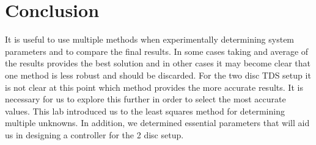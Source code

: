 \documentclass[11pt,titlepage]{article}
\begin{document}
	\section{Conclusion}
	It is useful to use multiple methods when experimentally determining system parameters and to compare the final results. In some cases taking and average of the results provides the best solution and in other cases it may become clear that one method is less robust and should be discarded. For the two disc TDS setup it is not clear at this point which method provides the more accurate results. It is necessary for us to explore this further in order to select the most accurate values. This lab introduced us to the least squares method for determining multiple unknowns. In addition, we determined essential parameters that will aid us in designing a controller for the 2 disc setup.
\end{document}
